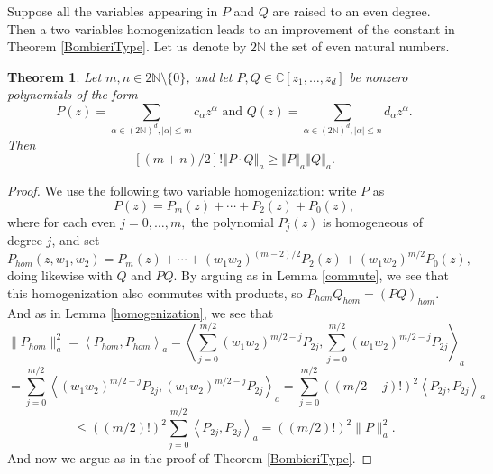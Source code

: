 \documentclass[12pt]{amsart}
\newtheorem{theorem}{Theorem}
\newcommand{\N}{\mathbb{N}}
\begin{document}
Suppose all the variables appearing in $P$ and $Q$ are raised to an even degree. Then a two variables homogenization leads to an improvement of the constant in Theorem \ref{BombieriType}. Let us denote by $2 \N$ the set of  even natural numbers. 

\begin{theorem} \label{BombieriEven}
	Let $m, n \in 2\N \setminus \{0\}$, and let $P , Q \in \mathbb{C}[z_{1},\dots,z_{d}]$ be nonzero 
	polynomials of the form \[
P\left(  z \right)  =\sum_{\alpha\in (2 \N)^d,\left\vert
\alpha\right\vert \leq m}c_{\alpha}z ^{\alpha}\text{ and }Q\left(  z\right)
=\sum_{\alpha\in (2 \N)^d,\left\vert \alpha\right\vert \leq
n}d_{\alpha}z^{\alpha}.
\] 
 Then
	\[
[\left(m + n\right)/2]! \left\Vert P \cdot Q \right\Vert _{a}
\ge
\left\Vert P \right\Vert _{a}  \left\Vert Q \right\Vert _{a}.
\]		
\end{theorem}

\begin{proof} We use the following two variable homogenization: write $P$ as 
\begin{equation*}
P\left( z \right) =P_{m}\left( z \right) + \cdots +P_{2}  (z) +P_{0}\left( z \right),
\end{equation*}
where for each even $j=0, \dots ,m,$
 the polynomial
 $P_{j}\left( z\right) $ is homogeneous of degree $j$, and set 
\begin{equation*}
P_{hom}\left( z , w_1, w_2\right) =P_{m}\left( z \right) + \cdots + (w_1 w_2)^{(m - 2)/2 } P_{2}  (z) + (w_1 w_2)^{m/2 } P_{0}\left( z \right),
\end{equation*}
doing likewise with $Q$ and $PQ$. By arguing as in Lemma \ref{commute}, we see that this homogenization also commutes with products, so $P_{hom} Q_{hom} = (PQ)_{hom}$. And as in Lemma \ref{homogenization}, we see that
\begin{equation*}
\|P_{hom}\|_a^2
=
\left\langle P_{hom} ,P_{hom} \right\rangle_{a}   
=  
\left\langle \sum_{j = 0}^{m/2}  (w_1 w_2)^{m/2 - j} P_{2j},\sum_{j = 0}^{m/2}   (w_1 w_2)^{m/2 - j} P_{2j}\right\rangle_{a}
\end{equation*}
\begin{equation*}
=  
\sum_{j = 0}^{m/2} \left\langle  (w_1 w_2)^{m/2 - j} P_{2j},  (w_1 w_2)^{m/2 - j} P_{2j} \right\rangle_{a}
=  
\sum_{j = 0}^{m/2} ((m/2 - j)!)^2\left\langle   P_{2j}, P_{2j}\right\rangle_{a}
\end{equation*}
\begin{equation*}
\le
((m/2)!)^2 \sum_{j = 0}^{m/2} \left\langle   P_{2j},  P_{2j} \right\rangle_{a} = ((m/2)!)^2 \|P\|_a^2.
\end{equation*}
And now we argue as in the proof of Theorem \ref{BombieriType}.
\end{proof}
\end{document}
